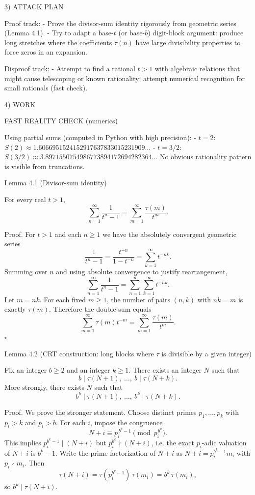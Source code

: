 3) ATTACK PLAN

Proof track:
- Prove the divisor-sum identity rigorously from geometric series (Lemma 4.1).
- Try to adapt a base-$t$ (or base-$b$) digit-block argument: produce long stretches where the
  coefficients $\tau(n)$ have large divisibility properties to force zeros in an expansion.

Disproof track:
- Attempt to find a rational $t>1$ with algebraic relations that might cause telescoping or known
  rationality; attempt numerical recognition for small rationals (fast check).

4) WORK

FAST REALITY CHECK (numerics)

Using partial sums (computed in Python with high precision):
- $t=2$: $S(2)\approx 1.6066951524152917637833015231909\dots$
- $t=3/2$: $S(3/2)\approx 3.8971550754986773894172694282364\dots$
No obvious rationality pattern is visible from truncations.

Lemma 4.1 (Divisor-sum identity)

For every real $t>1$,
\[
  \sum_{n=1}^\infty \frac{1}{t^n-1}=\sum_{m=1}^\infty \frac{\tau(m)}{t^m}.
\]

Proof.
For $t>1$ and each $n\ge 1$ we have the absolutely convergent geometric series
\[
  \frac{1}{t^n-1} = \frac{t^{-n}}{1-t^{-n}} = \sum_{k=1}^\infty t^{-nk}.
\]
Summing over $n$ and using absolute convergence to justify rearrangement,
\[
  \sum_{n=1}^\infty \frac{1}{t^n-1} = \sum_{n=1}^\infty\sum_{k=1}^\infty t^{-nk}.
\]
Let $m=nk$. For each fixed $m\ge 1$, the number of pairs $(n,k)$ with $nk=m$ is exactly $\tau(m)$.
Therefore the double sum equals
\[
  \sum_{m=1}^\infty \tau(m) t^{-m} = \sum_{m=1}^\infty \frac{\tau(m)}{t^m}.
\]
$\square$

Lemma 4.2 (CRT construction: long blocks where $\tau$ is divisible by a given integer)

Fix an integer $b\ge 2$ and an integer $k\ge 1$.
There exists an integer $N$ such that
\[
  b\mid \tau(N+1),\ \dots,\ b\mid\tau(N+k).
\]
More strongly, there exists $N$ such that
\[
  b^k \mid \tau(N+1),\ \dots,\ b^k\mid\tau(N+k).
\]

Proof.
We prove the stronger statement.
Choose distinct primes $p_1,\dots,p_k$ with $p_i>k$ and $p_i> b$.
For each $i$, impose the congruence
\[
  N+i \equiv p_i^{\,b^k-1} \pmod{p_i^{\,b^k}}.
\]
This implies $p_i^{b^k-1}\mid (N+i)$ but $p_i^{b^k}\nmid (N+i)$, i.e.
the exact $p_i$-adic valuation of $N+i$ is $b^k-1$.
Write the prime factorization of $N+i$ as
$N+i=p_i^{b^k-1}m_i$ with $p_i\nmid m_i$.
Then
\[
  \tau(N+i)=\tau(p_i^{b^k-1})\,\tau(m_i)=b^k\,\tau(m_i),
\]
so $b^k\mid\tau(N+i)$.

